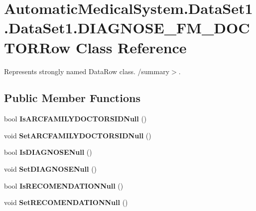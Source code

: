\section{AutomaticMedicalSystem.DataSet1.DataSet1.DIAGNOSE\_\-FM\_\-DOCTORRow Class Reference}
\label{class_automatic_medical_system_1_1_data_set1_1_1_d_i_a_g_n_o_s_e___f_m___d_o_c_t_o_r_row}
Represents strongly named DataRow class. /summary$>$.  


\subsection*{Public Member Functions}
\begin{CompactItemize}
\item 
bool \textbf{IsARCFAMILYDOCTORSIDNull} ()\label{class_automatic_medical_system_1_1_data_set1_1_1_d_i_a_g_n_o_s_e___f_m___d_o_c_t_o_r_row_5200b5cfdda0341f3c56f31ba3f7f3b5}

\item 
void \textbf{SetARCFAMILYDOCTORSIDNull} ()\label{class_automatic_medical_system_1_1_data_set1_1_1_d_i_a_g_n_o_s_e___f_m___d_o_c_t_o_r_row_ac4dd79dbadfb58c796b92eab5bf4c74}

\item 
bool \textbf{IsDIAGNOSENull} ()\label{class_automatic_medical_system_1_1_data_set1_1_1_d_i_a_g_n_o_s_e___f_m___d_o_c_t_o_r_row_ee7251a73a8a34bbdb3639e3e85017c7}

\item 
void \textbf{SetDIAGNOSENull} ()\label{class_automatic_medical_system_1_1_data_set1_1_1_d_i_a_g_n_o_s_e___f_m___d_o_c_t_o_r_row_6a088f2c013f1d4d3b7fd25b8f0511af}

\item 
bool \textbf{IsRECOMENDATIONNull} ()\label{class_automatic_medical_system_1_1_data_set1_1_1_d_i_a_g_n_o_s_e___f_m___d_o_c_t_o_r_row_e0fecc7ecda285772c8e3ac8a169ed3a}

\item 
void \textbf{SetRECOMENDATIONNull} ()\label{class_automatic_medical_system_1_1_data_set1_1_1_d_i_a_g_n_o_s_e___f_m___d_o_c_t_o_r_row_56f2da4804af77e2897ed3d53429a55d}

\end{CompactItemize}
